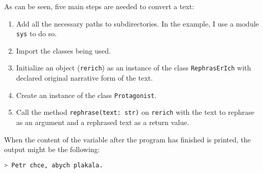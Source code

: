 As can be seen, five main steps are needed to convert a text:

\begin{enumerate}
	\item Add all the necessary paths to subdirectories. In the example, I use a module \texttt{sys} to do so.
	\item Import the classes being used.
	\item Initialize an object (\texttt{rerich}) as an instance of the class \texttt{RephrasErIch} with declared original narrative form of the text.
	\item Create an instance of the class \texttt{Protagonist}.
	\item Call the method \texttt{rephrase(text: str)} on \texttt{rerich} with the text to rephrase as an argument and a rephrased text as a return value.
\end{enumerate}

When the content of the variable after the program has finished is printed, the output might be the following:
\newline
\begin{lstlisting}[language=bash]
> Petr chce, abych plakala.
\end{lstlisting}

